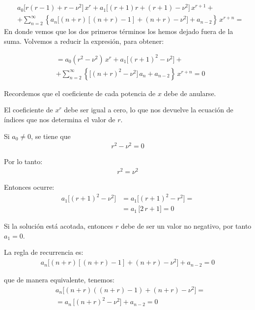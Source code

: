 \begin{align*}
&a_{0} \bigg[ r (r - 1) + r - \nu^{2} \bigg] \, x^{r} + a_{1} \bigg[ (r + 1) r + (r + 1) - \nu^{2} \bigg] \, x^{r+1} + \\[0.5em]
&+ \sum_{n=2}^{\infty} \left\{ a_{n} \bigg[ (n + r) \left[ (n + r) - 1 \right] + (n + r) - \nu^{2} \bigg] + a_{n-2} \right\} \, x^{r+n} =
\end{align*}
En donde vemos que los dos primeros términos los hemos dejado fuera de la suma. Volvemos a reducir la expresión, para obtener:

\begin{align*}
&= a_{0} (r^{2} - \nu^{2}) \, x^{r} + a_{1} \bigg[ (r + 1)^{2} - \nu^{2} \bigg] + \\[0.5em]
&+ \sum_{n=2}^{\infty} \left\{ \bigg[ (n + r)^{2} - \nu^{2} \bigg] \, a_{n} + a_{n-2} \right\} \, x^{r+n} = 0
\end{align*}

Recordemos que el coeficiente de cada potencia de $x$ debe de anularse.

El coeficiente de $x^{r}$ debe ser igual a cero, lo que nos devuelve la ecuación de índices que nos determina el valor de $r$.

Si $a_{0} \neq 0$, se tiene que
\begin{align*}
r^{2} - \nu^{2} = 0
\end{align*}

Por lo tanto:
\begin{align*}
r^{2} = \nu^{2}
\end{align*}

Entonces ocurre:
\begin{align*}
a_{1} \big[ (r + 1)^{2} - \nu^{2} \big] &= a_{1} \big[ (r + 1)^{2} - r^{2} \big] = \\[0.5em]
&= a_{1} \, \big[ 2 \, r + 1 \big] = 0
\end{align*}

Si la solución está acotada, entonces $r$ debe de ser un valor no negativo, por tanto $a_{1} = 0$.

La regla de recurrencia es:
\begin{align*}
a_{n} \big[ (n + r) \left[ (n + r) - 1 \right] + (n + r) - \nu^{2} \big] + a_{n-2} = 0
\end{align*}

que de manera equivalente, tenemos:
\begin{align*}
&a_{n} \big[ (n + r) \left( (n + r) - 1 \right) + (n + r) - \nu^{2} \big] = \\[0.5em]
&= a_{n} \, \big[ (n + r)^{2} - \nu^{2} \big] + a_{n-2} = 0
\end{align*}

